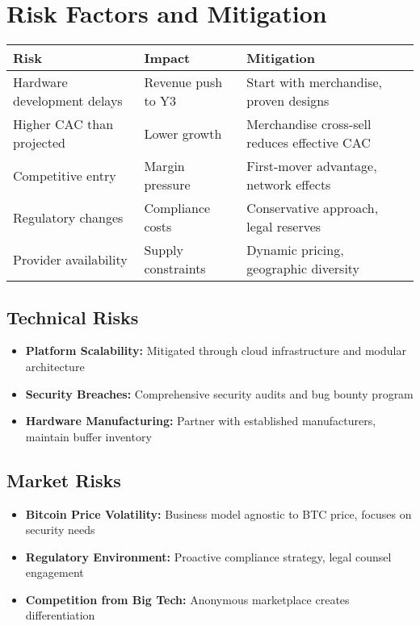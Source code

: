 
\section{Risk Factors and Mitigation}

\begin{table}[H]
\centering
\begin{tabularx}{\linewidth}{l X X}
\toprule
Risk & Impact & Mitigation \\\midrule
Hardware development delays & Revenue push to Y3 & Start with merchandise, proven designs \\
Higher CAC than projected & Lower growth & Merchandise cross-sell reduces effective CAC \\
Competitive entry & Margin pressure & First-mover advantage, network effects \\
Regulatory changes & Compliance costs & Conservative approach, legal reserves \\
Provider availability & Supply constraints & Dynamic pricing, geographic diversity \\
\bottomrule
\end{tabularx}
\end{table}

\subsection{Technical Risks}
\begin{itemize}
  \item \textbf{Platform Scalability:} Mitigated through cloud infrastructure and modular architecture
  \item \textbf{Security Breaches:} Comprehensive security audits and bug bounty program
  \item \textbf{Hardware Manufacturing:} Partner with established manufacturers, maintain buffer inventory
\end{itemize}

\subsection{Market Risks}
\begin{itemize}
  \item \textbf{Bitcoin Price Volatility:} Business model agnostic to BTC price, focuses on security needs
  \item \textbf{Regulatory Environment:} Proactive compliance strategy, legal counsel engagement
  \item \textbf{Competition from Big Tech:} Anonymous marketplace creates differentiation
\end{itemize}

